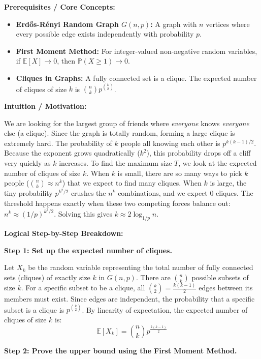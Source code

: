 \begin{solution}
\textbf{Prerequisites / Core Concepts:}
\begin{itemize}
    \item \textbf{Erdős-Rényi Random Graph $G(n,p)$:} A graph with $n$ vertices where every possible edge exists independently with probability $p$.
    \item \textbf{First Moment Method:} For integer-valued non-negative random variables, if $\mathbb{E}[X] \to 0$, then $\mathbb{P}(X \geq 1) \to 0$.
    \item \textbf{Cliques in Graphs:} A fully connected set is a clique. The expected number of cliques of size $k$ is $\binom{n}{k} p^{\binom{k}{2}}$.
\end{itemize}

\textbf{Intuition / Motivation:}

We are looking for the largest group of friends where \textit{everyone} knows \textit{everyone} else (a clique). Since the graph is totally random, forming a large clique is extremely hard. The probability of $k$ people all knowing each other is $p^{k(k-1)/2}$. Because the exponent grows quadratically ($k^2$), this probability drops off a cliff very quickly as $k$ increases.
To find the maximum size $T$, we look at the expected number of cliques of size $k$. When $k$ is small, there are so many ways to pick $k$ people ($\binom{n}{k} \approx n^k$) that we expect to find many cliques. When $k$ is large, the tiny probability $p^{k^2/2}$ crushes the $n^k$ combinations, and we expect 0 cliques. The threshold happens exactly when these two competing forces balance out: $n^k \approx (1/p)^{k^2/2}$. Solving this gives $k \approx 2 \log_{1/p} n$.

\textbf{Logical Step-by-Step Breakdown:}

\textbf{Step 1: Set up the expected number of cliques.}

Let $X_k$ be the random variable representing the total number of fully connected sets (cliques) of exactly size $k$ in $G(n,p)$.
There are $\binom{n}{k}$ possible subsets of size $k$.
For a specific subset to be a clique, all $\binom{k}{2} = \frac{k(k-1)}{2}$ edges between its members must exist.
Since edges are independent, the probability that a specific subset is a clique is $p^{\binom{k}{2}}$.
By linearity of expectation, the expected number of cliques of size $k$ is:
\[ \mathbb{E}[X_k] = \binom{n}{k} p^{\frac{k(k-1)}{2}} \]

\textbf{Step 2: Prove the upper bound using the First Moment Method.}


\end{solution}
